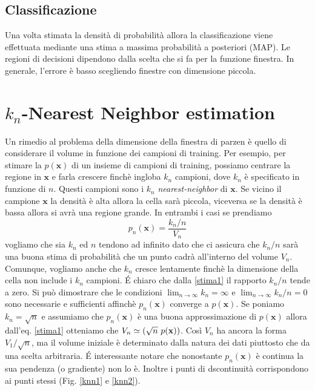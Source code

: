\subsection{Classificazione}
Una volta stimata la densità di probabilità allora la classificazione viene effettuata mediante una stima a massima probabilità a posteriori (MAP). Le regioni di decisioni dipendono dalla scelta che si fa per la funzione finestra. In generale, l'errore è basso scegliendo finestre con dimensione piccola.

\section{$k_n$-Nearest Neighbor estimation}
 Un rimedio al problema della dimensione della finestra di parzen è quello di considerare il volume in funzione dei campioni di training. Per esempio, per stimare la $p(\mathbf{x})$ di un insieme di campioni di training, possiamo centrare la regione in $\mathbf{x}$ e farla crescere finchè ingloba $k_n$ campioni, dove $k_n$ è specificato in funzione di $n$. Questi campioni sono i $k_n$ \emph{nearest-neighbor} di $\mathbf{x}$. Se vicino il campione $\mathbf{x}$ la densità è alta allora la cella sarà piccola, viceversa se la densità è bassa allora si avrà una regione grande. In entrambi i casi se prendiamo
 \begin{equation}\label{stima1}
p_n(\mathbf{x}) = \frac{k_n/n}{V_n}
\end{equation}
vogliamo che sia $k_n$ ed $n$ tendono ad infinito dato che ci assicura che $k_n/n$ sarà una buona stima di probabilità che un punto cadrà all'interno del volume $V_n$. Comunque, vogliamo anche che $k_n$ cresce lentamente finchè la dimensione della cella non include i $k_n$ campioni. \'E chiaro che dalla \ref{stima1} il rapporto $k_n/n$ tende a zero. Si può dimostrare che le condizioni $\lim_{n \to \infty} k_n = \infty$ e $\lim_{n \to \infty} k_n/n = 0$ sono necessarie e sufficienti affinchè $p_n(\mathbf{x})$ converge a $p(\mathbf{x})$. Se poniamo $k_n=\sqrt{n}$ e assumiamo che $p_n(\mathbf{x})$ è una buona approssimazione di $p(\mathbf{x})$ allora dall'eq. \ref{stima1} otteniamo che $V_n \simeq \/(\sqrt{n} \ p(\mathbf{x}))$. Così $V_n$ ha ancora la forma $V_1/\sqrt{n}$, ma il volume iniziale è determinato dalla natura dei dati piuttosto che da una scelta arbitraria. \'E interessante notare che nonostante $p_n(\mathbf{x})$ è continua la sua pendenza (o gradiente) non lo è. Inoltre i punti di dscontinuità corrispondono ai punti stessi (Fig. \ref{knn1} e \ref{knn2}).

